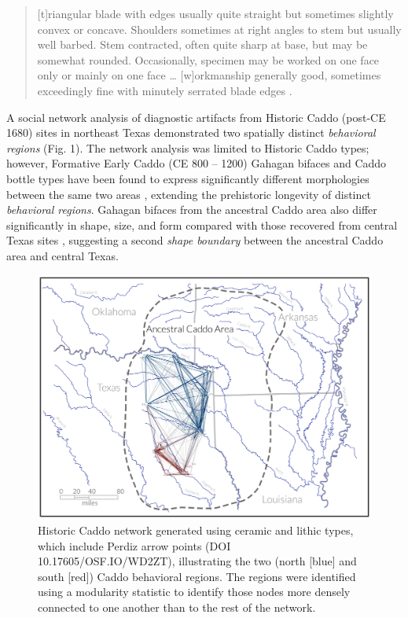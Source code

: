 \documentclass[smallextended]{svjour3}       %
\begin{document}
\begin{quote}
{[}t{]}riangular blade with edges usually quite straight but sometimes
slightly convex or concave. Shoulders sometimes at right angles to stem
but usually well barbed. Stem contracted, often quite sharp at base, but
may be somewhat rounded. Occasionally, specimen may be worked on one
face only or mainly on one face \ldots{} {[}w{]}orkmanship generally
good, sometimes exceedingly fine with minutely serrated blade edges
\cite[504]{RN5769}.
\end{quote}

A social network analysis of diagnostic artifacts from Historic Caddo
(post-CE 1680) sites in northeast Texas demonstrated two spatially
distinct \emph{behavioral regions} \cite{RN8031} (Fig. 1). The network
analysis was limited to Historic Caddo types; however, Formative Early
Caddo (CE 800 -- 1200) Gahagan bifaces and Caddo bottle types have been
found to express significantly different morphologies between the same
two areas \cite{RN8074,RN7927,RN8370,RN8312}, extending the prehistoric
longevity of distinct \emph{behavioral regions}. Gahagan bifaces from
the ancestral Caddo area also differ significantly in shape, size, and
form compared with those recovered from central Texas sites
\cite{RN8322}, suggesting a second \emph{shape boundary} between the
ancestral Caddo area and central Texas.

\begin{figure}
\includegraphics[width=1\linewidth]{ms-figs/figure1} \caption{Historic Caddo network generated using ceramic and lithic types, which include Perdiz arrow points (DOI 10.17605/OSF.IO/WD2ZT), illustrating the two (north [blue] and south [red]) Caddo behavioral regions. The regions were identified using a modularity statistic to identify those nodes more densely connected to one another than to the rest of the network.}\label{fig:fig1}
\end{figure}
\end{document}
